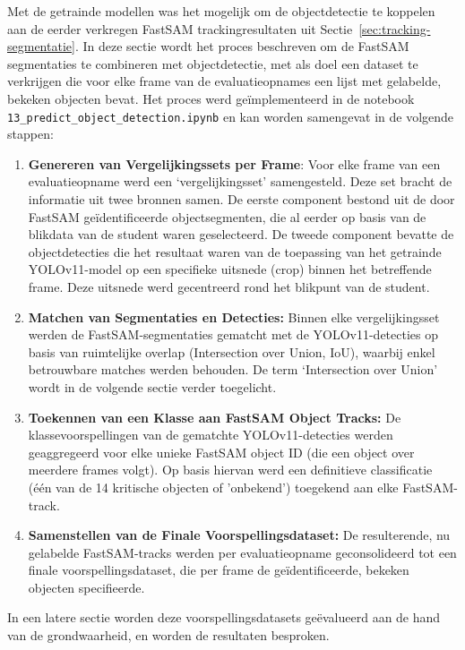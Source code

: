 Met de getrainde modellen was het mogelijk om de objectdetectie te koppelen aan de eerder verkregen FastSAM trackingresultaten uit Sectie~\ref{sec:tracking-segmentatie}.
In deze sectie wordt het proces beschreven om de FastSAM segmentaties te combineren met objectdetectie,
met als doel een dataset te verkrijgen die voor elke frame van de evaluatieopnames een lijst met gelabelde, bekeken objecten bevat.
Het proces werd geïmplementeerd in de notebook \texttt{13\_predict\_object\_detection.ipynb} en kan worden samengevat in de volgende stappen:
\begin{enumerate}
    \item \textbf{Genereren van Vergelijkingssets per Frame}: Voor elke frame van een evaluatieopname werd een 
    `vergelijkingsset' samengesteld. 
    Deze set bracht de informatie uit twee bronnen samen. 
    De eerste component bestond uit de door FastSAM geïdentificeerde objectsegmenten, 
    die al eerder op basis van de blikdata van de student waren geselecteerd. 
    De tweede component bevatte de objectdetecties die het resultaat waren van de toepassing van het getrainde 
    YOLOv11-model op een specifieke uitsnede (crop) binnen het betreffende frame. 
    Deze uitsnede werd gecentreerd rond het blikpunt van de student.
    \item \textbf{Matchen van Segmentaties en Detecties:} 
    Binnen elke vergelijkingsset werden de FastSAM-segmentaties gematcht met de YOLOv11-detecties op 
    basis van ruimtelijke overlap (Intersection over Union, IoU), waarbij enkel betrouwbare matches werden behouden.
    De term `Intersection over Union' wordt in de volgende sectie verder toegelicht.
    \item \textbf{Toekennen van een Klasse aan FastSAM Object Tracks:} 
    De klassevoorspellingen van de gematchte YOLOv11-detecties werden geaggregeerd voor elke unieke FastSAM object ID 
    (die een object over meerdere frames volgt). 
    Op basis hiervan werd een definitieve classificatie (één van de 14 kritische objecten of 'onbekend') 
    toegekend aan elke FastSAM-track.
    \item \textbf{Samenstellen van de Finale Voorspellingsdataset:} 
    De resulterende, nu gelabelde FastSAM-tracks werden per evaluatieopname geconsolideerd 
    tot een finale voorspellingsdataset, die per frame de geïdentificeerde, bekeken objecten specifieerde.
\end{enumerate}
In een latere sectie worden deze voorspellingsdatasets geëvalueerd aan de hand van de grondwaarheid, en worden de resultaten besproken.

